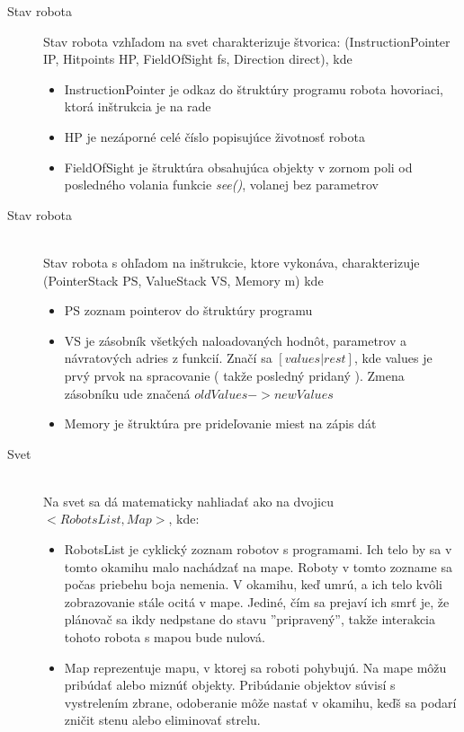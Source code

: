 \begin{description}
\item [Stav robota]
	Stav robota vzhľadom na svet charakterizuje štvorica: (InstructionPointer IP, Hitpoints HP, FieldOfSight fs, Direction direct), kde 
\begin{itemize}
\item InstructionPointer je odkaz do štruktúry programu robota hovoriaci, ktorá inštrukcia je na rade
\item HP je nezáporné celé číslo popisujúce životnosť robota
\item FieldOfSight je štruktúra obsahujúca objekty v zornom poli od posledného volania funkcie \emph{see()}, volanej bez parametrov 
\end{itemize}
\item[Stav robota] \hfill \\
	Stav robota s ohľadom na inštrukcie, ktore vykonáva, charakterizuje (PointerStack PS, ValueStack VS, Memory m) kde
\begin{itemize}
\item PS zoznam pointerov do štruktúry programu
\item VS je zásobník všetkých naloadovaných hodnôt, parametrov  a návratových adries z funkcií. Značí sa $[values|rest]$, kde values je prvý prvok na spracovanie ( takže posledný pridaný ). Zmena zásobníku ude značená $ oldValues -> newValues $
\item Memory je štruktúra pre prideľovanie miest na zápis dát
\end{itemize}
\label{StavRobota}
\item[Svet] \hfill \\
Na svet sa dá matematicky nahliadať ako na dvojicu $< RobotsList, Map >$, kde:
\begin{itemize}
\item RobotsList je cyklický zoznam robotov s programami. Ich telo by sa v tomto okamihu malo nachádzať na mape. Roboty v tomto zozname sa počas priebehu boja nemenia. V okamihu, keď umrú, a ich telo kvôli zobrazovanie stále ocitá v mape. Jediné, čím sa prejaví ich smrť je, že plánovač sa ikdy nedpstane do stavu ''pripravený'', takže interakcia tohoto robota s mapou bude nulová.
\item Map reprezentuje mapu, v ktorej sa roboti pohybujú. Na mape môžu pribúdať alebo miznúť objekty. Pribúdanie objektov súvisí s vystrelením zbrane, odoberanie môže nastať v okamihu, keďš sa podarí zničit stenu alebo eliminovať strelu.
\end{itemize}
\end{description}
